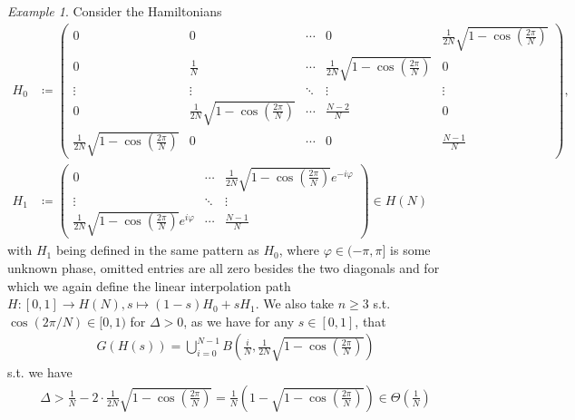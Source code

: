 \documentclass[10pt]{amsart}
\theoremstyle{definition}
\theoremstyle{remark}
\newtheorem{example}[theorem]{Example}
\begin{document}
    \begin{example} \label{circles_example}
        Consider the Hamiltonians
        \begin{align}
            H_0 &\coloneqq \begin{pmatrix}
                                                                      0 &           0 & \cdots & 0 & \frac{1}{2N}\sqrt{1-\cos\left(\frac{2\pi}{N}\right)}\\
                                                                      0 & \frac{1}{N} & \cdots & \frac{1}{2N}\sqrt{1-\cos\left(\frac{2\pi}{N}\right)} & 0\\
                                                                 \vdots &      \vdots & \ddots & \vdots & \vdots\\
                                                                      0 &  \frac{1}{2N}\sqrt{1-\cos\left(\frac{2\pi}{N}\right)} & \cdots & \frac{N-2}{N} & 0\\
                    \frac{1}{2N}\sqrt{1-\cos\left(\frac{2\pi}{N}\right)} &           0 & \cdots & 0 & \frac{N-1}{N}
            \end{pmatrix},\\
            H_1 &\coloneqq \begin{pmatrix}
                0 & \cdots & \frac{1}{2N}\sqrt{1-\cos\left(\frac{2\pi}{N}\right)}e^{-i\varphi}\\
                \vdots & \ddots & \vdots\\
                \frac{1}{2N}\sqrt{1-\cos\left(\frac{2\pi}{N}\right)}e^{i\varphi} & \cdots & \frac{N-1}{N}
            \end{pmatrix} \in H(N)
        \end{align}
        with \(H_1\) being defined in the same pattern as \(H_0\), where \(\varphi \in (-\pi, \pi]\) is some unknown phase, omitted entries are all zero besides the two diagonals and for which we again define the linear interpolation path \(H\colon [0, 1] \to H(N), s \mapsto (1-s)H_0+sH_1\). We also take \(n \geq 3\) s.t. \(\cos(2\pi/N) \in [0, 1)\) for \(\Delta > 0\), as we have for any \(s \in [0, 1]\), that
        \begin{align}
            G(H(s)) = \bigcup_{i=0}^{N-1} B\left(\frac{i}{N}, \frac{1}{2N}\sqrt{1-\cos\left(\frac{2\pi}{N}\right)}\right)
        \end{align}
        s.t. we have
        \begin{align}
            \Delta > \frac{1}{N} - 2 \cdot \frac{1}{2N}\sqrt{1-\cos\left(\frac{2\pi}{N}\right)} = \frac{1}{N}\left(1-\sqrt{1-\cos\left(\frac{2\pi}{N}\right)}\right) \in \Theta\left(\frac{1}{N}\right)

\end{align}
\end{example}
\end{document}
